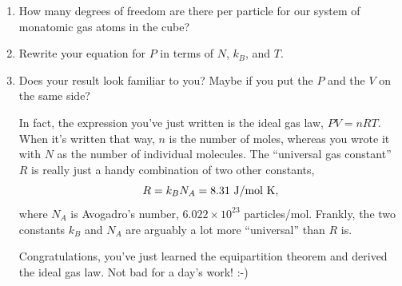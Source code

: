 \begin{enumerate}[labparts]
\item How many degrees of freedom are there per particle for our system of monatomic gas atoms in the cube?
\answerspace{0.5in}

\item Rewrite your equation for $P$ in terms of $N$, $k_B$, and $T$.  
\answerspace{0.6in}


\item Does your result look familiar to you?  Maybe if you put the $P$ and the $V$ on the same side?
\answerspace{0.6in}

\pagebreak[3]

In fact, the expression you've just written is the ideal gas law, $PV = nRT$.  When it's written that way, $n$ is the number of moles, whereas you wrote it with $N$ as the number of individual molecules.  The ``universal gas constant'' $R$ is really just a handy combination of two other constants, 
$$R =k_BN_A=8.31~{\rm J/mol ~K,}$$
where $N_A$ is Avogadro's number, $6.022 \times 10^{23}$ particles/mol. Frankly, the two constants $k_B$ and $N_A$ are arguably a lot more ``universal'' than $R$ is. 

\medskip

Congratulations, you've just learned the equipartition theorem and derived the ideal gas law.  Not bad for a day's work! :-)

\end{enumerate}